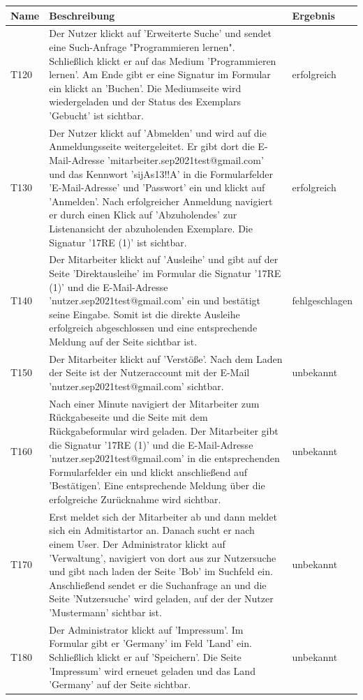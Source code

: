 \documentclass{article}
\begin{document}
\begin{table}[H]
    \centering
    \begin{tabular}{ p{3em} p{32em} p{5em} }
        \toprule
        \textbf{Name} & \textbf{Beschreibung} & \textbf{Ergebnis}\\
        \midrule
        T120 & Der Nutzer klickt auf ’Erweiterte Suche’ und sendet eine Such-Anfrage "Programmieren lernen". Schließlich klickt er auf das Medium ’Programmieren lernen’. Am Ende gibt er eine Signatur im Formular ein klickt an ’Buchen’. Die Mediumseite wird wiedergeladen und der Status des Exemplars ’Gebucht’ ist sichtbar. & erfolgreich\\
        T130 & Der Nutzer klickt auf ’Abmelden’ und wird auf die Anmeldungsseite weitergeleitet. Er gibt dort die E-Mail-Adresse ’mitarbeiter.sep2021test@gmail.com’ und das Kennwort ’sijAs13!!A’ in die Formularfelder ’E-Mail-Adresse’ und ’Passwort’ ein und klickt auf ’Anmelden’. Nach erfolgreicher Anmeldung navigiert er durch einen Klick auf ’Abzuholendes’ zur Listenansicht der abzuholenden Exemplare. Die Signatur ’17RE (1)’ ist sichtbar. & erfolgreich\\
        T140 & Der Mitarbeiter klickt auf ’Ausleihe’ und gibt auf der Seite ’Direktausleihe’ im Formular die Signatur ’17RE (1)’ und die E-Mail-Adresse ’nutzer.sep2021test@gmail.com’ ein und bestätigt seine Eingabe. Somit ist die direkte Ausleihe erfolgreich abgeschlossen und eine entsprechende Meldung auf der Seite sichtbar ist. & fehlgeschlagen\\
        T150 & Der Mitarbeiter klickt auf ’Verstöße’. Nach dem Laden der Seite ist der Nutzeraccount mit der E-Mail ’nutzer.sep2021test@gmail.com’ sichtbar. & unbekannt\\
        T160 & Nach einer Minute navigiert der Mitarbeiter zum Rückgabeseite und die Seite mit dem Rückgabeformular wird geladen. Der Mitarbeiter gibt die Signatur ’17RE (1)’ und die E-Mail-Adresse ’nutzer.sep2021test@gmail.com’ in die entsprechenden Formularfelder ein und klickt anschließend auf ’Bestätigen’. Eine entsprechende Meldung über die erfolgreiche Zurücknahme wird sichtbar. & unbekannt\\
        T170 & Erst meldet sich der Mitarbeiter ab und dann meldet sich ein Admitistartor an. Danach sucht er nach einem User. Der Administrator klickt auf ’Verwaltung’, navigiert von dort aus zur Nutzersuche und gibt nach laden der Seite ’Bob’ im Suchfeld ein. Anschließend sendet er die Suchanfrage an und die Seite ’Nutzersuche’ wird geladen, auf der der Nutzer ’Mustermann’ sichtbar ist. & unbekannt\\
        T180 & Der Administrator klickt auf ’Impressum’. Im Formular gibt er ’Germany’ im Feld ’Land’ ein. Schließlich klickt er auf ’Speichern’. Die Seite ’Impressum’ wird erneuet geladen und das Land ’Germany’ auf der Seite sichtbar. & unbekannt\\
        \bottomrule
    \end{tabular}
\end{table}
\end{document}
